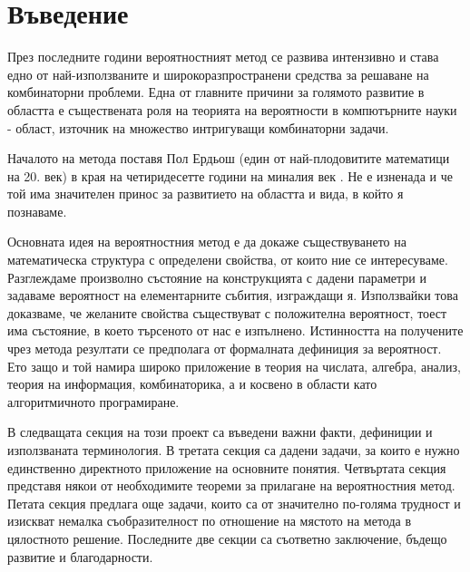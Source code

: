 \documentclass[11 pt, a4paper]{article}
\theoremstyle{definition}
\theoremstyle{remark}
\begin{document}
\section{Въведение}
През последните години вероятностният метод се развива интензивно и става едно от най-използваните и широкоразпространени средства за решаване на комбинаторни проблеми. Една от главните причини за голямото развитие в областта е съществената роля на теорията на вероятности в компютърните науки - област, източник на множество интригуващи комбинаторни задачи.\par
Началото на метода поставя Пол Ердьош (един от най-плодовитите математици на 20. век) в края на четиридесетте години на миналия век . Не е изненада и че той има значителен принос за развитието на областта и вида, в който я познаваме.\par
Основната идея на вероятностния метод е да докаже съществуването на математическа структура с определени свойства, от които ние се интересуваме. Разглеждаме произволно състояние на конструкцията с дадени параметри и задаваме вероятност на елементарните събития, изграждащи я. Използвайки това доказваме, че желаните свойства съществуват с положителна вероятност, тоест има състояние, в което търсеното от нас е изпълнено. Истинността на получените чрез метода резултати се предполага от формалната дефиниция за вероятност. Ето защо и той намира широко приложение в теория на числата, алгебра, анализ, теория на информация, комбинаторика, а и косвено в области като алгоритмичното програмиране.\par
В следващата секция на този проект са въведени важни факти, дефиниции и използваната терминология. В третата секция са дадени задачи, за които е нужно единственно директното приложение на основните понятия. Четвъртата секция представя някои от необходимите теореми за прилагане на вероятностния метод. Петата секция предлага още задачи, които са от значително по-голяма трудност и изискват немалка съобразителност по отношение на мястото на метода в цялостното решение. Последните две секции са съответно заключение, бъдещо развитие и благодарности. 
\newpage
\end{document}
